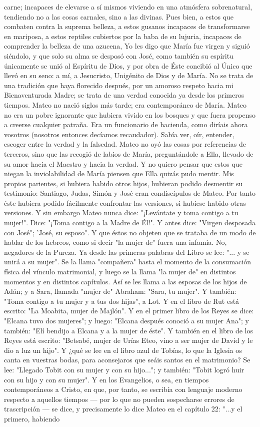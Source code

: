 \documentclass[12pt]{book} %
\begin{document}
carne; incapaces de elevarse a sí mismos viviendo en una atmósfera sobrenatural, tendiendo no a las cosas carnales, sino a las divinas. Pues bien, a estos que combaten contra la suprema belleza, a estos gusanos incapaces de transformarse en mariposa, a estos reptiles cubiertos por la baba de su lujuria, incapaces de comprender la belleza de una azucena, Yo les digo que María fue virgen y siguió siéndolo, y que solo su alma se desposó con José, como también su espíritu únicamente se unió al Espíritu de Dios, y por obra de Éste concibió al Único que llevó en su seno: a mí, a Jesucristo, Unigénito de Dios y de María. No se trata de una tradición que haya florecido después, por un amoroso respeto hacia mi Bienaventurada Madre; se trata de una verdad conocida ya desde los primeros tiempos. Mateo no nació siglos más tarde; era contemporáneo de María. Mateo no era un pobre ignorante que hubiera vivido en los bosques y que fuera propenso a creerse cualquier patraña. Era un funcionario de hacienda, como diríais ahora vosotros (nosotros entonces decíamos recaudador). Sabía ver, oír, entender, escoger entre la verdad y la falsedad. Mateo no oyó las cosas por referencias de terceros, sino que las recogió de labios de María, preguntándole a Ella, llevado de su amor hacia el Maestro y hacia la verdad. Y no quiero pensar que estos que niegan la inviolabilidad de María piensen que Ella quizás pudo mentir. Mis propios parientes, si hubiera habido otros hijos, hubieran podido desmentir su testimonio: Santiago, Judas, Simón y José eran condiscípulos de Mateo. Por tanto éste hubiera podido fácilmente confrontar las versiones, si hubiese habido otras versiones. Y sin embargo Mateo nunca dice: "¡Levántate y toma contigo a tu mujer!". Dice: "¡Toma contigo a la Madre de Él!". Y antes dice: "Virgen desposada con José"; 'José, su esposo". Y que éstos no objeten que se trataba de un modo de hablar de los hebreos, como si decir "la mujer de" fuera una infamia. No, negadores de la Pureza. Ya desde las primeras palabras del Libro se lee: "... y se unirá a su mujer". Se la llama "compañera" hasta el momento de la consumación física del vínculo matrimonial, y luego se la llama "la mujer de" en distintos momentos y en distintos capítulos. Así se les llama a las esposas de los hijos de Adán; y a Sara, llamada "mujer de" Abraham: "Sara, tu mujer". Y también: "Toma contigo a tu mujer y a tus dos hijas", a Lot. Y en el libro de Rut está escrito: "La Moabita, mujer de Majlón". Y en el primer libro de los Reyes se dice: "Elcana tuvo dos mujeres"; y luego: "Elcana después conoció a su mujer Ana"; y también: "Elí bendijo a Elcana y a la mujer de éste". Y también en el libro de los Reyes está escrito: "Betsabé, mujer de Urías Eteo, vino a ser mujer de David y le dio a luz un hijo". Y ¿qué se lee en el libro azul de Tobías, lo que la Iglesia os canta en vuestras bodas, para aconsejaros que seáis santos en el matrimonio? Se lee: "Llegado Tobit con su mujer y con su hijo..."; y también: "Tobit logró huir con su hijo y con su mujer". Y en los Evangelios, o sea, en tiempos contemporáneos a Cristo, en que, por tanto, se escribía con lenguaje moderno respecto a aquellos tiempos — por lo que no pueden sospecharse errores de trascripción — se dice, y precisamente lo dice Mateo en el capítulo 22: "...y el primero, habiendo 
\end{document}
